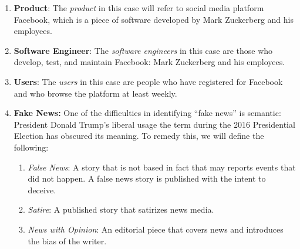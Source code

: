 \begin{enumerate}

\item{\textbf{Product}: The \emph{product} in this case will refer to social media platform Facebook, which is a piece of software developed by Mark Zuckerberg and his employees.
}

\item{\textbf{Software Engineer}: The \emph{software engineers} in this case are those who develop, test, and maintain Facebook: Mark Zuckerberg and his employees.
}

\item{\textbf{Users}: The \emph{users} in this case are people who have registered for Facebook and who browse the platform at least weekly.
}

\item{\textbf{Fake News:} One of the difficulties in identifying ``fake news'' is semantic: President Donald Trump's liberal usage the term during the 2016 Presidential Election has obscured its meaning. \cite{npr_fake_news} To remedy this, we will define the following:
\begin{enumerate}
    \item{\emph{False News}: A story that is not based in fact that may reports events that did not happen. A false news story is published with the intent to deceive. \cite{ted_becka}}
    \item{\emph{Satire}: A published story that satirizes news media. \cite{ted_becka}}
    \item{\emph{News with Opinion}: An editorial piece that covers news and introduces the bias of the writer. \cite{ted_becka}}
\end{enumerate}
}

\end{enumerate}
